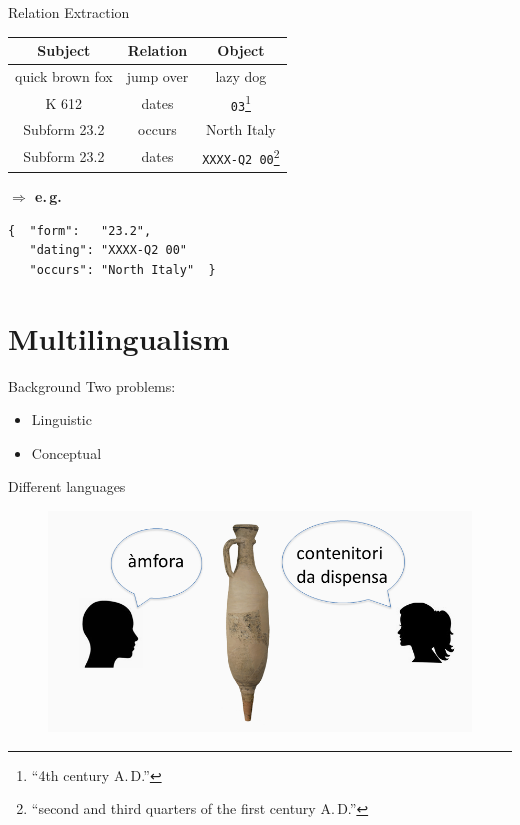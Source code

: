 \documentclass[xcolor=x11names, aspectratio=169,usenames,dvipsnames]{beamer}
\begin{document}
\begin{frame}[fragile]{Relation Extraction}
\begin{center}
\begin{tabularx}{\textwidth}{CCC}
\toprule
\textbf{Subject}&\textbf{Relation}&\textbf{Object}\\\midrule
quick brown fox&jump over&lazy dog\\
K 612&dates&\texttt{03}\footnote{\enquote{4th century A.\,D.}}\\
Subform 23.2&occurs&North Italy\\
Subform 23.2&dates&\texttt{XXXX-Q2 00}\footnote{\enquote{second and third quarters of the first century A.\,D.}}\\
\bottomrule
\end{tabularx}\bigskip\pause

\begin{minipage}{0.3\textwidth}\flushright
\textbf{$\boldsymbol{\Rightarrow}$ e.\,g.}
\end{minipage}\hfill
\begin{minipage}{0.65\textwidth}
{
\begin{verbatim}
{  "form":   "23.2",
   "dating": "XXXX-Q2 00"
   "occurs": "North Italy"  }
\end{verbatim}
}
\end{minipage}
\end{center}
\end{frame}

\section{Multilingualism}

\begin{frame}{Background}
Two problems:
\begin{itemize}
\item Linguistic
\item Conceptual
\end{itemize}
\end{frame}

\begin{frame}{Different languages}
\begin{center}
\begin{figure}
\includegraphics[width=\textwidth]{img/tim_vocab_1.png}
\end{figure}
\end{center}
\end{frame}
\end{document}
